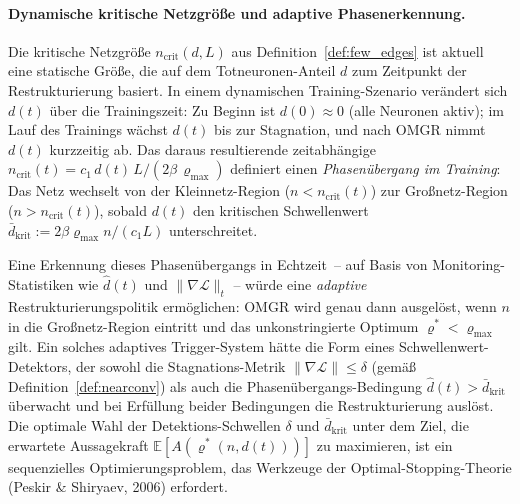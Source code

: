 \documentclass[12pt, a4paper, openany]{report}
\newcommand{\E}{\mathbb{E}}
\newcommand{\calL}{\mathcal{L}}
\begin{document}
\paragraph{Dynamische kritische Netzgröße und adaptive Phasenerkennung.}
Die kritische Netzgröße $n_{\mathrm{crit}}(d, L)$ aus
Definition~\ref{def:few_edges} ist aktuell eine statische Größe, die auf
dem Totneuronen-Anteil $d$ zum Zeitpunkt der Restrukturierung basiert.  In
einem dynamischen Training-Szenario verändert sich $d(t)$ über die
Trainingszeit: Zu Beginn ist $d(0) \approx 0$ (alle Neuronen aktiv); im Lauf
des Trainings wächst $d(t)$ bis zur Stagnation, und nach OMGR nimmt $d(t)$
kurzzeitig ab.  Das daraus resultierende zeitabhängige
$n_{\mathrm{crit}}(t) = c_1\,d(t)\,L / (2\beta\,\varrho_{\max})$
definiert einen \emph{Phasenübergang im Training}: Das Netz wechselt von
der Kleinnetz-Region ($n < n_{\mathrm{crit}}(t)$) zur Großnetz-Region
($n > n_{\mathrm{crit}}(t)$), sobald $d(t)$ den kritischen Schwellenwert
$\bar{d}_{\mathrm{krit}} := 2\beta\varrho_{\max} n / (c_1 L)$ unterschreitet.

Eine Erkennung dieses Phasenübergangs in Echtzeit~-- auf Basis von
Monitoring-Statistiken wie $\hat{d}(t)$ und $\|\nabla\calL\|_{t}$ -- würde
eine \emph{adaptive} Restrukturierungspolitik ermöglichen: OMGR wird genau
dann ausgelöst, wenn $n$ in die Großnetz-Region eintritt und das
unkonstringierte Optimum $\varrho^* < \varrho_{\max}$ gilt.  Ein solches
adaptives Trigger-System hätte die Form eines Schwellenwert-Detektors, der
sowohl die Stagnations-Metrik $\|\nabla\calL\| \leq \delta$ (gemäß
Definition~\ref{def:nearconv}) als auch die Phasenübergangs-Bedingung
$\hat{d}(t) > \bar{d}_{\mathrm{krit}}$ überwacht und bei Erfüllung beider
Bedingungen die Restrukturierung auslöst.  Die optimale Wahl der
Detektions-Schwellen $\delta$ und $\bar{d}_{\mathrm{krit}}$ unter dem
Ziel, die erwartete Aussagekraft $\E[A(\varrho^*(n, d(t)))]$ zu maximieren,
ist ein sequenzielles Optimierungsproblem, das Werkzeuge der
Optimal-Stopping-Theorie (Peskir \& Shiryaev, 2006) erfordert.
\end{document}
